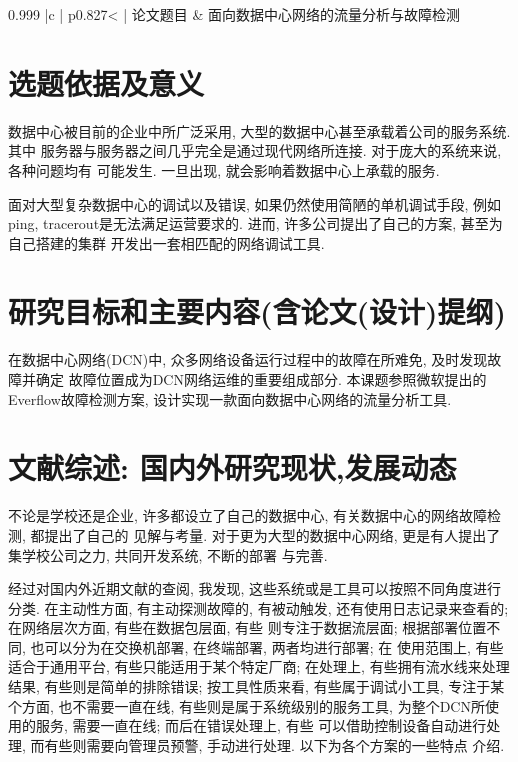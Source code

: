 
\vspace{-4pt}
{

\noindent
\begin{tabular*}{0.999\textwidth}
    {|c | p{}< {\centering} |}
    \hline
    {\songti 论文题目} & {\songti 面向数据中心网络的流量分析与故障检测} \\ 
    \hline
\end{tabular*}
\indent

\begin{mdframed}[everyline=true]


\section{选题依据及意义}

数据中心被目前的企业中所广泛采用,
大型的数据中心甚至承载着公司的服务系统. 其中
服务器与服务器之间几乎完全是通过现代网络所连接. 对于庞大的系统来说,
各种问题均有 可能发生. 一旦出现, 就会影响着数据中心上承载的服务.

面对大型复杂数据中心的调试以及错误, 如果仍然使用简陋的单机调试手段,
例如ping, tracerout是无法满足运营要求的. 进而, 许多公司提出了自己的方案,
甚至为自己搭建的集群 开发出一套相匹配的网络调试工具.

  


\section{研究目标和主要内容(含论文(设计)提纲)}

在数据中心网络(DCN)中, 众多网络设备运行过程中的故障在所难免,
及时发现故障并确定 故障位置成为DCN网络运维的重要组成部分.
本课题参照微软提出的Everflow故障检测方案,
设计实现一款面向数据中心网络的流量分析工具.

\section{文献综述: 国内外研究现状,发展动态}

不论是学校还是企业, 许多都设立了自己的数据中心,
有关数据中心的网络故障检测, 都提出了自己的 见解与考量.
对于更为大型的数据中心网络, 更是有人提出了集学校公司之力, 共同开发系统,
不断的部署 与完善.

经过对国内外近期文献的查阅, 我发现,
这些系统或是工具可以按照不同角度进行分类. 在主动性方面,
有主动探测故障的, 有被动触发, 还有使用日志记录来查看的; 在网络层次方面,
有些在数据包层面, 有些 则专注于数据流层面; 根据部署位置不同,
也可以分为在交换机部署, 在终端部署, 两者均进行部署; 在 使用范围上,
有些适合于通用平台, 有些只能适用于某个特定厂商; 在处理上,
有些拥有流水线来处理结果, 有些则是简单的排除错误; 按工具性质来看,
有些属于调试小工具, 专注于某个方面, 也不需要一直在线,
有些则是属于系统级别的服务工具, 为整个DCN所使用的服务, 需要一直在线;
而后在错误处理上, 有些 可以借助控制设备自动进行处理,
而有些则需要向管理员预警, 手动进行处理. 以下为各个方案的一些特点 介绍.


\end{mdframed}}
